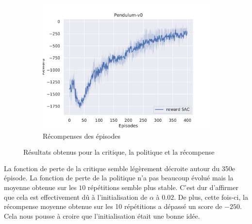 \begin{figure}[H]
\begin{subfigure}{0.3\textwidth}
    \end{subfigure}
    \begin{subfigure}{0.3\textwidth}
        \includegraphics[width=\textwidth]{figures/sac_itr2/rewards_Pendulum-v0_pg_dataset_td_eval_True_cycles_40_trajs_20_batches_20_gamma_0.99_nstep_5_lr_act_0.01_lr_critic_0.01.pdf}
        \caption{Récompenses des épisodes}
    \end{subfigure}
    \caption{Résultats obtenus pour la critique, la politique et la récompense}
    \label{fig:sac:results2}
\end{figure}

La fonction de perte de la critique semble légèrement décroite autour du 350e épisode. La fonction de perte de la politique n'a pas beaucoup évolué mais la moyenne obtenue sur les $10$ répétitions semble plus stable. C'est dur d'affirmer que cela est effectivement dû à l'initialisation de $\alpha$ à $0.02$. De plus, cette fois-ci, la récompense moyenne obtenue sur les 10 répétitions a dépassé un score de  $-250$. Cela nous pousse à croire que l'initialisation était une bonne idée.

